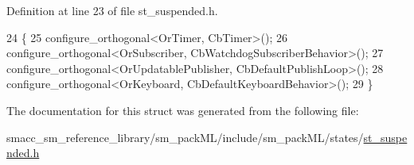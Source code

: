 Definition at line 23 of file st\+\_\+suspended.\+h.


\begin{DoxyCode}
24     \{
25         configure\_orthogonal<OrTimer, CbTimer>();   
26         configure\_orthogonal<OrSubscriber, CbWatchdogSubscriberBehavior>();
27         configure\_orthogonal<OrUpdatablePublisher, CbDefaultPublishLoop>();
28         configure\_orthogonal<OrKeyboard, CbDefaultKeyboardBehavior>();
29     \}
\end{DoxyCode}


The documentation for this struct was generated from the following file\+:\begin{DoxyCompactItemize}
\item 
smacc\+\_\+sm\+\_\+reference\+\_\+library/sm\+\_\+pack\+M\+L/include/sm\+\_\+pack\+M\+L/states/\hyperlink{st__suspended_8h}{st\+\_\+suspended.\+h}\end{DoxyCompactItemize}

